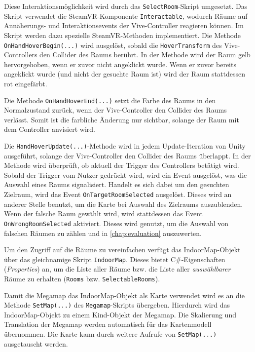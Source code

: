 Diese Interaktionsmöglichkeit wird durch das \lstinline|SelectRoom|-Skript umgesetzt.
Das Skript verwendet die SteamVR-Komponente \lstinline|Interactable|, wodurch Räume auf An\-nä\-he\-rungs- und Interaktionsevents der Vive-Controller reagieren können.
Im Skript werden dazu spezielle SteamVR-Methoden implementiert.
Die Methode \lstinline|OnHandHoverBegin(...)| wird ausgelöst, sobald die \lstinline|HoverTransform| des Vive-Controllers den Collider des Raums berührt.
In der Methode wird der Raum gelb hervorgehoben, wenn er zuvor nicht angeklickt wurde.
Wenn er zuvor bereits angeklickt wurde (und nicht der gesuchte Raum ist) wird der Raum stattdessen rot eingefärbt.

Die Methode \lstinline|OnHandHoverEnd(...)| setzt die Farbe des Raums in den Normalzustand zurück, wenn der Vive-Controller den Collider des Raums verlässt.
Somit ist die farbliche Änderung nur sichtbar, solange der Raum mit dem Controller anvisiert wird.

Die \lstinline|HandHoverUpdate(...)|-Methode wird in jedem Update-Iteration von Unity ausgeführt, solange der Vive-Controller den Collider des Raums überlappt.
In der Methode wird überprüft, ob aktuell der Trigger des Controllers betätigt wird.
Sobald der Trigger vom Nutzer gedrückt wird, wird ein Event ausgelöst, was die Auswahl eines Raums signalisiert.
Handelt es sich dabei um den gesuchten Zielraum, wird das Event \lstinline|OnTargetRoomSelected| ausgelöst.
Dieses wird an anderer Stelle benutzt, um die Karte bei Auswahl des Zielraums auszublenden.
Wenn der falsche Raum gewählt wird, wird stattdessen das Event \lstinline|OnWrongRoomSelected| aktiviert.
Dieses wird genutzt, um die Auswahl von falschen Räumen zu zählen und in \autoref{chap:evaluation} auszuwerten. 

Um den Zugriff auf die Räume zu vereinfachen verfügt das IndoorMap-Objekt über das gleichnamige Skript \lstinline|IndoorMap|.
Dieses bietet C\#-Eigenschaften (\emph{Properties}) an, um die Liste aller Räume bzw. die Liste aller \emph{auswählbarer} Räume zu erhalten (\lstinline|Rooms| bzw. \lstinline|SelectableRooms|).

Damit die Megamap das IndoorMap-Objekt als Karte verwendet wird es an die Methode \lstinline|SetMap(...)| des \lstinline|Megamap|-Skripts übergeben.
Hierdurch wird das IndoorMap-Objekt zu einem Kind-Objekt der Megamap.
Die Skalierung und Translation der Megamap werden automatisch für das Kartenmodell übernommen.
Die Karte kann durch weitere Aufrufe von \lstinline|SetMap(...)| ausgetauscht werden.

